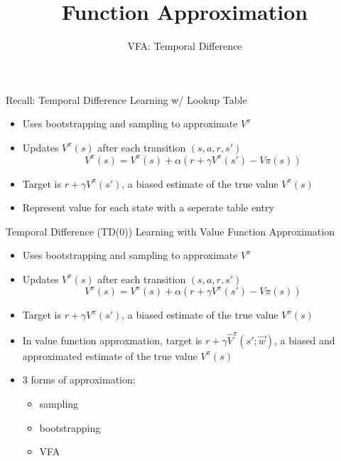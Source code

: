 


\title[Reinforcement Learning: Function Approximation]{Function Approximation}
\subtitle{VFA: Temporal Difference}



	
	\maketitle

\begin{frame}[c]{Recall: Temporal Difference Learning w/ Lookup Table}
	
	\begin{itemize}
		\item Uses bootstrapping and sampling to approximate $V^\pi$
		\item Updates $V^\pi(s)$ after each transition $(s,a,r,s')$
		$$V^\pi(s) = V^\pi (s) + \alpha(r + \gamma V^\pi (s') - V\pi(s)) $$
		\item Target is $r + \gamma V^\pi(s')$, a biased estimate of the true value $V^\pi(s)$
		\item Represent value for each state with a seperate table entry
	\end{itemize}

\end{frame}
\begin{frame}[c]{Temporal Difference (TD(0)) Learning with Value
		Function Approximation}
	
	\begin{itemize}
		\item Uses bootstrapping and sampling to approximate $V^\pi$
		\item Updates $V^\pi(s)$ after each transition $(s,a,r,s')$
		$$V^\pi(s) = V^\pi (s) + \alpha(r + \gamma V^\pi (s') - V\pi(s)) $$
		\item Target is $r + \gamma V^\pi(s')$, a biased estimate of the true value $V^\pi(s)$
		\item In value function approxmation, target is $r + \gamma \hat{V}^\pi (s'; \vec{w})$, a biased and approximated estimate of the true value $V^\pi(s)$
		\item 3 forms of approximation: 
		\begin{itemize}
			\item sampling
			\item bootstrapping
			\item VFA
		\end{itemize}
	\end{itemize}
	
\end{frame}
